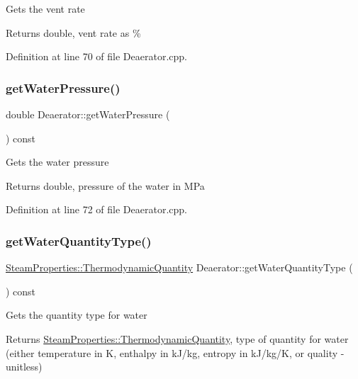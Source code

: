 Gets the vent rate \begin{DoxyReturn}{Returns}
double, vent rate as \% 
\end{DoxyReturn}


Definition at line 70 of file Deaerator.\+cpp.

\mbox{\label{class_deaerator_ae86ef305a8641d61ec76bd39bb84f28b}} 
\subsubsection{\texorpdfstring{get\+Water\+Pressure()}{getWaterPressure()}}
{\footnotesize\ttfamily double Deaerator\+::get\+Water\+Pressure (\begin{DoxyParamCaption}{ }\end{DoxyParamCaption}) const}

Gets the water pressure \begin{DoxyReturn}{Returns}
double, pressure of the water in M\+Pa 
\end{DoxyReturn}


Definition at line 72 of file Deaerator.\+cpp.

\mbox{\label{class_deaerator_a414282f81906e09a28bc75cf51659ec2}} 
\subsubsection{\texorpdfstring{get\+Water\+Quantity\+Type()}{getWaterQuantityType()}}
{\footnotesize\ttfamily \hyperlink{class_steam_properties_ae0294bedf7d178c2d8fb6aed0f62fbff}{Steam\+Properties\+::\+Thermodynamic\+Quantity} Deaerator\+::get\+Water\+Quantity\+Type (\begin{DoxyParamCaption}{ }\end{DoxyParamCaption}) const}

Gets the quantity type for water \begin{DoxyReturn}{Returns}
\hyperlink{class_steam_properties_ae0294bedf7d178c2d8fb6aed0f62fbff}{Steam\+Properties\+::\+Thermodynamic\+Quantity}, type of quantity for water (either temperature in K, enthalpy in k\+J/kg, entropy in k\+J/kg/K, or quality -\/ unitless) 
\end{DoxyReturn}


